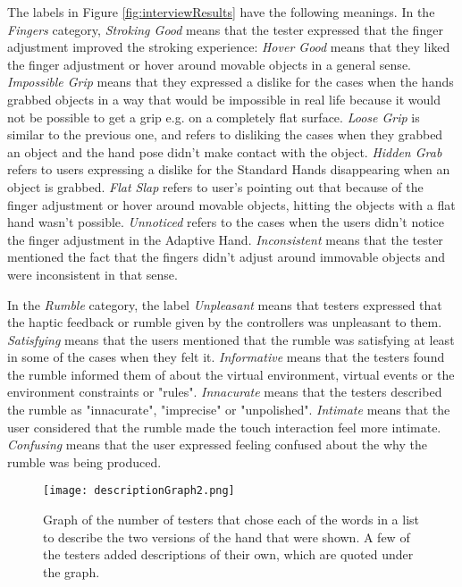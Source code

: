 The labels in Figure \ref{fig:interviewResults} have the following meanings. In the \textit{Fingers} category, \textit{Stroking Good} means that the tester expressed that the finger adjustment improved the stroking experience: \textit{Hover Good} means that they liked the finger adjustment or hover around movable objects in a general sense. \textit{Impossible Grip} means that they expressed a dislike for the cases when the hands grabbed objects in a way that would be impossible in real life because it would not be possible to get a grip e.g. on a completely flat surface. \textit{Loose Grip} is similar to the previous one, and refers to disliking the cases when they grabbed an object and the hand pose didn't make contact with the object. \textit{Hidden Grab} refers to users expressing a dislike for the Standard Hands disappearing when an object is grabbed. \textit{Flat Slap} refers to user's pointing out that because of the finger adjustment or hover around movable objects, hitting the objects with a flat hand wasn't possible. \textit{Unnoticed} refers to the cases when the users didn't notice the finger adjustment in the Adaptive Hand. \textit{Inconsistent} means that the tester mentioned the fact that the fingers didn't adjust around immovable objects and were inconsistent in that sense.


In the \textit{Rumble} category, the label \textit{Unpleasant} means that testers expressed that the haptic feedback or rumble given by the controllers was unpleasant to them. \textit{Satisfying} means that the users mentioned that the rumble was satisfying at least in some of the cases when they felt it. \textit{Informative} means that the testers found the rumble informed them of about the virtual environment, virtual events or the environment constraints or "rules". \textit{Innacurate} means that the testers described the rumble as "innacurate", "imprecise" or "unpolished". \textit{Intimate} means that the user considered that the rumble made the touch interaction feel more intimate. \textit{Confusing} means that the user expressed feeling confused about the why the rumble was being produced.

\begin{figure}[H]
\centering
\texttt{[image: descriptionGraph2.png]}
\caption{Graph of the number of testers that chose each of the words in a list to describe the two versions of the hand that were shown. A few of the testers added descriptions of their own, which are quoted under the graph.}
\label{fig:descriptionGraph}
\end{figure}

